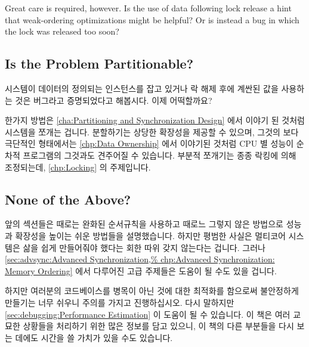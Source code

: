 Great care is required, however.
Is the use of data following lock release a hint that weak-ordering
optimizations might be helpful?
Or is instead a bug in which the lock was released too soon?

\fi

\subsection{Is the Problem Partitionable?}
\label{sec:app:questions:Is the Problem Partitionable?}

시스템이 데이터의 정의되는 인스턴스를 잡고 있거나 락 해제 후에 계싼된 값을
사용하는 것은 버그라고 증명되었다고 해봅시다.
이제 어떡할까요?

한가지 방법은
\cref{cha:Partitioning and Synchronization Design}
에서 이야기 된 것처럼 시스템을 쪼개는 겁니다.
분할하기는 상당한 확장성을 제공할 수 있으며, 그것의 보다 극단적인 형태에서는
\cref{chp:Data Ownership} 에서 이야기된 것처럼 CPU 별 성능이 순차적 프로그램의
그것과도 견주어질 수 있습니다.
부분적 쪼개기는 종종 락킹에 의해 조정되는데,
\cref{chp:Locking} 의 주제입니다.

\iffalse

Suppose that the system holds the defining instance of the data,
or that using a computed value past lock release proved to be a bug.
What then?

One approach is to partition the system, as discussed in
\cref{cha:Partitioning and Synchronization Design}.
Partititioning can provide excellent scalability and in its more
extreme form, per-CPU performance rivaling that of a sequential program,
as discussed in \cref{chp:Data Ownership}.
Partial partitioning is often mediated by locking, which is the subject of
\cref{chp:Locking}.

\fi

\subsection{None of the Above?}
\label{sec:app:questions:None of the Above?}

앞의 섹션들은 때로는 완화된 순서규칙을 사용하고 때로느 그렇지 않은 방법으로
성능과 확장성을 높이는 쉬운 방법들을 설명했습니다.
하지만 평범한 사실은 멀티코어 시스템은 삶을 쉽게 만들어줘야 했다는 회한 따위
갖지 않는다는 겁니다.
그러나
\cref{sec:advsync:Advanced Synchronization,%
chp:Advanced Synchronization: Memory Ordering}
에서 다루어진 고급 주제들은 도움이 될 수도 있을 겁니다.

하지만 여러분의 코드베이스를 병목이 아닌 것에 대한 최적화를 함으로써 불안정하게
만들기는 너무 쉬우니 주의를 가지고 진행하십시오.
다시 말하지만 \cref{sec:debugging:Performance Estimation} 이 도움이 될 수
있습니다.
이 책은 여러 교묘한 상황들을 처리하기 위한 많은 정보를 담고 있으니, 이 책의
다른 부분들을 다시 보는 데에도 시간을 쓸 가치가 있을 수도 있습니다.

